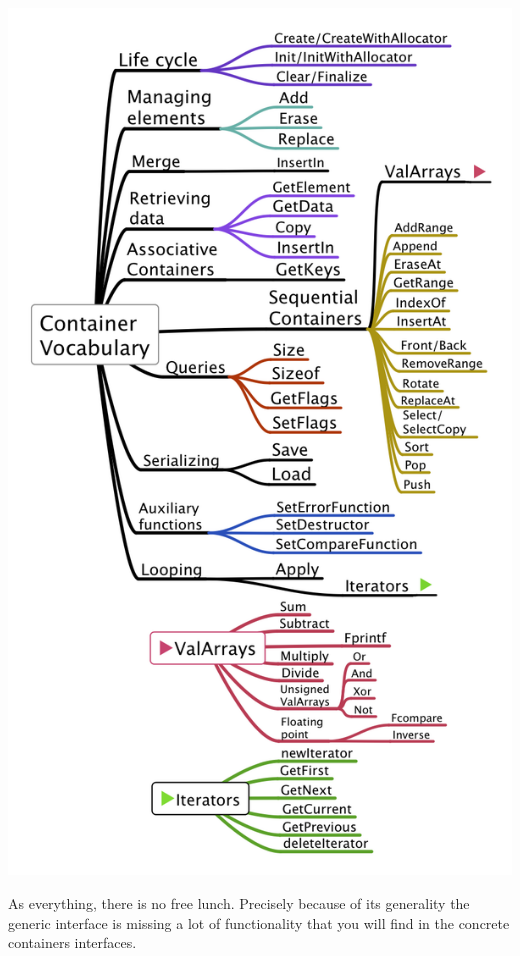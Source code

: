 \documentclass[12pt,a4paper]{memoir} %
\begin{document}
\includegraphics[scale=0.4]{Vocabulary.png}\par

As everything, there is no free lunch. Precisely because of its generality the generic interface is missing a lot of functionality that you will find
in the concrete containers interfaces. 
\end{document}
